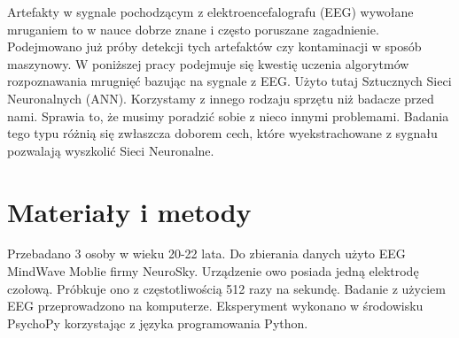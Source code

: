 \documentclass{article}
\begin{document}
    Artefakty w sygnale pochodzącym z elektroencefalografu (EEG) wywołane mruganiem to w nauce dobrze znane i często poruszane zagadnienie. Podejmowano już próby detekcji tych artefaktów czy kontaminacji w sposób maszynowy. W poniższej pracy podejmuje się kwestię uczenia algorytmów rozpoznawania mrugnięć bazując na sygnale z EEG. Użyto tutaj Sztucznych Sieci Neuronalnych (ANN). Korzystamy z innego rodzaju sprzętu niż badacze przed nami. Sprawia to, że musimy poradzić sobie z nieco innymi problemami. Badania tego typu różnią się zwłaszcza doborem cech, które wyekstrachowane z sygnału pozwalają wyszkolić Sieci Neuronalne.

\newpage

\section{Materiały i metody}
    Przebadano 3 osoby w wieku 20-22 lata. 
    Do zbierania danych użyto EEG MindWave Moblie firmy NeuroSky. Urządzenie owo posiada jedną elektrodę czołową. Próbkuje ono z częstotliwością 512 razy na sekundę.
    Badanie z użyciem EEG przeprowadzono na komputerze. Eksperyment wykonano w środowisku PsychoPy korzystając z języka programowania Python.
\end{document}
